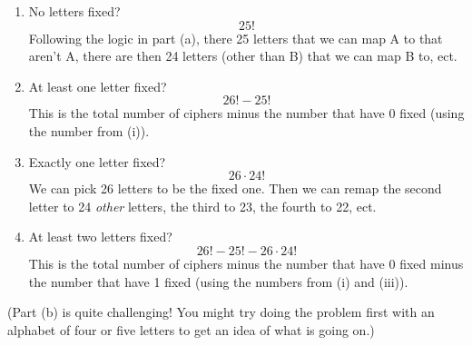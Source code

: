 \documentclass[12pt]{amsart}
\theoremstyle{definition}
\begin{document}
\begin{enumerate}
\begin{enumerate}
			\begin{enumerate}
				\item No letters fixed? 
				$$25!$$ Following the logic in part (a), there 25 letters that we can map A to that aren't A, there are then 24 letters (other than B) that we can map B to, ect.
				\item At least one letter fixed?  $$26! - 25!$$
				This is the total number of ciphers minus the number that have 0 fixed (using the number from (i)).
				\item Exactly one letter fixed?
				$$26 \cdot 24!$$ We can pick 26 letters to be the fixed one. Then we can remap the second letter to 24 \emph{other} letters, the third to 23, the fourth to 22, ect.
				\item At least two letters fixed?
				$$26!-25!-26\cdot 24!$$ This is the total number of ciphers minus the number that have 0 fixed minus the number that have 1 fixed (using the numbers from (i) and (iii)).
				
			\end{enumerate}
			(Part (b) is quite challenging! You might try doing the problem first with an alphabet 
			of four or five letters to get an idea of what is going on.)
		\end{enumerate}
\end{enumerate}
\end{document}

